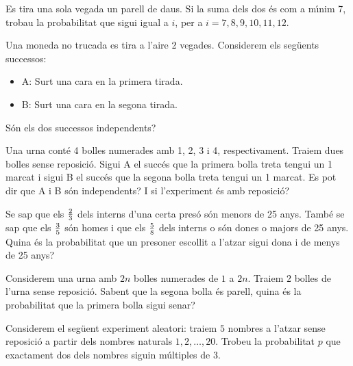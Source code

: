 \begin{prob}
{Es tira una sola vegada un parell de daus. Si la suma dels dos \'es
com a m\'{\i}nim 7, trobau la probabilitat que sigui igual a $i$, per a
$i=7,8,9,10,11,12$.}
\end{prob}

\begin{prob}
{Una moneda no trucada es tira a l'aire 2 vegades. Considerem els
seg\"uents successos:
\begin{itemize}
\item {A: Surt una cara en la primera tirada.}
\item {B: Surt una cara en la segona tirada.}
\end{itemize}
S\'on els dos successos independents?}
\end{prob}

\begin{prob}
{Una urna cont\'e 4 bolles numerades amb 1, 2, 3 i 4, respectivament. Traiem
dues bolles sense reposici\'o. Sigui A el succ\'es que la primera bolla
treta tengui un 1 marcat i sigui B el succ\'es que la segona bolla treta
tengui un 1 marcat. Es pot dir que A i B s\'on independents? I si
l'experiment \'es amb reposici\'o?}
\end{prob}

\begin{prob}
{Se sap que els ${2\over 3}$ dels interns d'una certa pres\'o s\'on menors
de 25 anys. Tamb\'e se sap que els ${3\over 5}$ s\'on homes i que els
${5\over8}$ dels interns o s\'on dones o majors de 25 anys. Quina \'es
la probabilitat que
un presoner escollit a l'atzar sigui dona i de menys de 25
anys?}
\end{prob}

\begin{prob}
{
Considerem una urna amb $2n$ bolles numerades de $1$ a $2n$. Traiem
$2$ bolles de l'urna sense reposici\'o. Sabent que la segona bolla \'es
parell, quina \'es la probabilitat que la primera bolla sigui senar?
}
\end{prob}

\begin{prob}
{
Considerem el seg\"uent experiment aleatori: traiem $5$ nombres a l'atzar
sense reposici\'o a partir dels nombres naturals $1,2,\ldots,20$. Trobeu la 
probabilitat $p$ que exactament dos dels nombres siguin m\'ultiples de
$3$. 
}
\end{prob}

